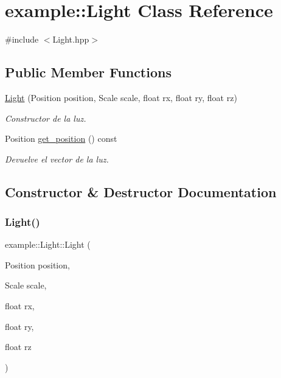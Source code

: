 \hypertarget{classexample_1_1_light}{}\section{example\+::Light Class Reference}
\label{classexample_1_1_light}


{\ttfamily \#include $<$Light.\+hpp$>$}

\subsection*{Public Member Functions}
\begin{DoxyCompactItemize}
\item 
\mbox{\hyperlink{classexample_1_1_light_a43a81af6c261901e5b1b135ece6c5e8f}{Light}} (Position position, Scale scale, float rx, float ry, float rz)
\begin{DoxyCompactList}\small\item\em Constructor de la luz. \end{DoxyCompactList}\item 
Position \mbox{\hyperlink{classexample_1_1_light_a89c8fa686e615b0ab0ef0e3d4b1df361}{get\+\_\+position}} () const
\begin{DoxyCompactList}\small\item\em Devuelve el vector de la luz. \end{DoxyCompactList}\end{DoxyCompactItemize}


\subsection{Constructor \& Destructor Documentation}
\mbox{\label{classexample_1_1_light_a43a81af6c261901e5b1b135ece6c5e8f}} 
\subsubsection{\texorpdfstring{Light()}{Light()}}
{\footnotesize\ttfamily example\+::\+Light\+::\+Light (\begin{DoxyParamCaption}\item[{Position}]{position,  }\item[{Scale}]{scale,  }\item[{float}]{rx,  }\item[{float}]{ry,  }\item[{float}]{rz }\end{DoxyParamCaption})\hspace{0.3cm}{\ttfamily [inline]}}



